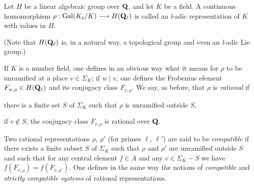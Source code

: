 \begin{dfn}
Let $H$ be a linear algebraic group over $\mathbf{Q}$, and let $K$ be a field.
A continuous homomorphism
$\rho : \mathrm{Gal}(K_s/K) \longrightarrow H(\mathbf{Q}_\ell)$ is called an
\textit{l}-adic representation of $K$ with values in $H$.
\end{dfn}

(Note that $H(\mathbf{Q}_\ell)$ is, in a natural way, a topological group and
even an \textit{l}-adic Lie group.)

If $K$ is a number field, one defines in an obvious way what it means
for $\rho$ to be unramified at a place $v \in \Sigma_K$; if $w \mid
v$, one defines the Frobenius element $F_{w,\rho} \in H(\mathbf{Q}_\ell)$ and
its conjugacy class $F_{v,\rho}$.  We say, as before, that $\rho$ is
\emph{rational} if
\begin{alist}
\item there is a finite set $S$ of $\Sigma_K$ such that $\rho$ is
unramified outside $S$,
\item if $v \notin S$, the conjugacy class $F_{v,\rho}$ is rational
over $\mathbf{Q}$.
\end{alist}
Two rational representations $\rho$, $\rho'$ (for primes $\ell$,
$\ell'$) are said to be \emph{compatible} if there exists a finite
subset $S$ of $\Sigma_K$ such that $\rho$ and $\rho'$ are unramified
outside $S$ and such that for any central element $f \in A$ and any
$v \in \Sigma_K - S$ we have
$f(F_{v,\rho}) = f(F_{v,\rho'})$.  One defines in the same way the
notions of \emph{compatible} and \emph{strictly compatible systems} of
rational representations.

